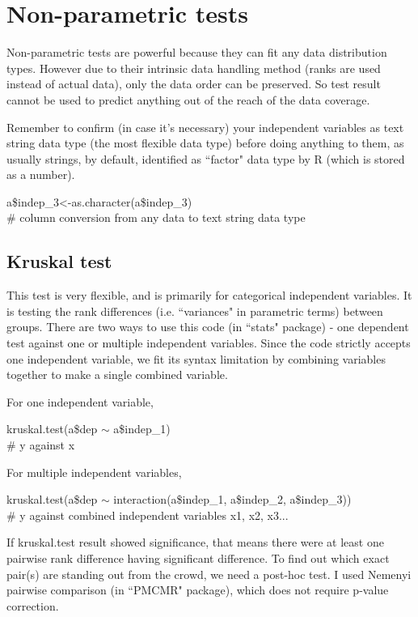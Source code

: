 \documentclass[../note.tex]{subfiles} %
\begin{document}
\section{Non-parametric tests}
Non-parametric tests are powerful because they can fit any data distribution types.  However due to their intrinsic data handling method (ranks are used instead of actual data), only the data order can be preserved.  So test result cannot be used to predict anything out of the reach of the data coverage.

Remember to confirm (in case it's necessary) your independent variables as text string data type (the most flexible data type) before doing anything to them, as usually strings, by default, identified as ``factor" data type by R (which is stored as a number).
\begin{code}
a\$indep\_3<-as.character(a\$indep\_3)\\\# column conversion from any data to text string data type
\end{code}

\subsection{Kruskal test}
This test is very flexible, and is primarily for categorical independent variables.  It is testing the rank differences (i.e. ``variances" in parametric terms) between groups.  There are two ways to use this code (in ``stats" package\autocite{Rcore}) - one dependent test against one or multiple independent variables.  Since the code strictly accepts one independent variable, we fit its syntax limitation by combining variables together to make a single combined variable.

For one independent variable,
\begin{code}
kruskal.test(a\$dep $\sim$ a\$indep\_1)\\\# y against x
\end{code}

For multiple independent variables,
\begin{code}
kruskal.test(a\$dep $\sim$ interaction(a\$indep\_1, a\$indep\_2, a\$indep\_3))\\\# y against combined independent variables x1, x2, x3...
\end{code}

If kruskal.test result showed significance, that means there were at least one pairwise rank difference having significant difference.  To find out which exact pair(s) are standing out from the crowd, we need a post-hoc test.  I used Nemenyi pairwise comparison (in ``PMCMR" package\autocite{PMCMR}), which does not require p-value correction\autocite{PMCMR}.
\end{document}
